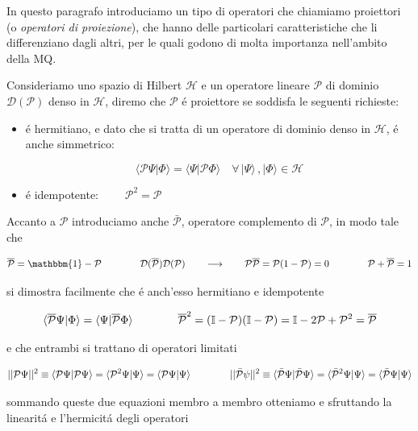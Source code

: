 In questo paragrafo introduciamo un tipo di operatori che chiamiamo proiettori (o \textit{operatori di proiezione}), che hanno delle particolari caratteristiche che li differenziano dagli altri, per le quali godono di molta importanza nell'ambito della MQ.

Consideriamo uno spazio di Hilbert $\mathcal{H}$ e un operatore lineare $\mathcal{P}$ di dominio $\mathcal{D}(\mathcal{P})$ denso in $\mathcal{H}$, diremo che $\mathcal{P}$ \'e proiettore se soddisfa le seguenti richieste:
\begin{itemize}
\item \'e hermitiano, e dato che si tratta di un operatore di dominio denso in $\mathcal{H}$, \'e anche simmetrico:

$$\langle{\mathcal{P}}\Psi|\Phi\rangle=\langle\Psi|{\mathcal{P}}\Phi\rangle\quad\forall\,|\Psi\rangle\,,|\Phi\rangle\in{\mathcal{H}}$$

\item \'e idempotente: $\qquad \mathcal{P}^2 = \mathcal{P}$
\end{itemize}

Accanto a $\mathcal{P}$ introduciamo anche $\bar{\mathcal{P}}$, operatore complemento di $\mathcal{P}$, in modo tale che

$${\overline{{\mathcal{P}}}}=\mathbbm{1}-{\mathcal{P}} \qquad\qquad \mathcal{D}(\overline{\mathcal{P}}) \mathcal{D}({\mathcal{P}})\qquad\longrightarrow\qquad {\mathcal{P}}{\overline{{{\mathcal{P}}}}}={\mathcal{P}}(1-{\mathcal{P}})=0 \qquad\qquad
{\mathcal{P}}+{\overline{{{\mathcal{P}}}}}=1$$

si dimostra facilmente che \'e anch'esso hermitiano e idempotente 

$$\langle\overline{{{\cal P}}}\Psi|\Phi\rangle=\langle\Psi|\overline{{{\cal P}}}\Phi\rangle \qquad\qquad
{\overline{{{\mathcal{P}}}}}^{2}=(\mathbb{I}-{\mathcal{P}})(\mathbb{I}-{\mathcal{P}})=\mathbb{I}-2{\mathcal{P}}+{\mathcal{P}}^{2}={\overline{{{\mathcal{P}}}}}$$

e che entrambi si trattano di operatori limitati

$$||\mathcal{P} \Psi||^2 \equiv \braket{\mathcal{P} \Psi}{\mathcal{P} \Psi} = \braket{\mathcal{P}^2 \Psi}{\Psi} = \braket{\mathcal{P} \Psi}{\Psi} \qquad\qquad 
||\bar{\mathcal{P}} \psi||^2 \equiv \braket{\bar{\mathcal{P}} \Psi}{\bar{\mathcal{P}} \Psi} = \braket{\bar{\mathcal{P}}^2 \Psi}{\Psi} = \braket{\bar{\mathcal{P}} \Psi}{\Psi} $$

sommando queste due equazioni membro a membro otteniamo e sfruttando la linearit\'a e l'hermicit\'a degli operatori

